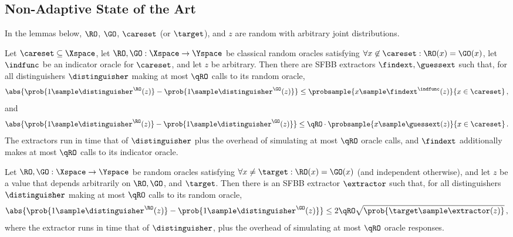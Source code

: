   \subsection{Non-Adaptive State of the Art}
    In the lemmas below, $\RO$, $\GO$, $\careset$ (or $\target$), and $z$ are random
      with arbitrary joint distributions.

    \begin{lemma}
      Let $\careset \subseteq \Xspace$, let $\RO, \GO: \Xspace \to \Yspace$
      be classical random oracles satisfying $\forall x \not\in \careset: \RO(x) =
      \GO(x)$, let $\indfunc$ be an indicator oracle for $\careset$, and let $z$ be arbitrary. Then 
      there are SFBB extractors $\findext, \guessext$ such that, for all distinguishers
      $\distinguisher$ making at most $\qRO$ calls to its random oracle,
      \[
        \abs{
          \prob{1 \sample \distinguisher^{\RO}(z)} - \prob{1 \sample \distinguisher^{\GO}(z)}
        } \leq \probsample{x \sample \findext^{\indfunc}(z)}{x \in \careset}\, ,
      \]
      and
      \[
        \abs{
          \prob{1 \sample \distinguisher^{\RO}(z)} - \prob{1 \sample \distinguisher^{\GO}(z)}
        } \leq \qRO \cdot \probsample{x \sample \guessext(z)}{x \in \careset}\, .
      \]
      The extractors run in time that of $\distinguisher$ plus the
      overhead of simulating at most $\qRO$ oracle calls, and
      $\findext$ additionally makes at most $\qRO$ calls to its
      indicator oracle.
    \end{lemma}

    \begin{lemma}
      Let $\RO, \GO: \Xspace \to \Yspace$
      be random oracles satisfying $\forall x \neq \target: \RO(x) =
      \GO(x)$ (and independent otherwise), and let $z$ be a value that depends arbitrarily on $\RO, \GO$,
      and $\target$. Then there is an SFBB extractor $\extractor$ such that, for all distinguishers
      $\distinguisher$ making at most $\qRO$ calls to its random oracle,
      \[
        \abs{
          \prob{1 \sample \distinguisher^{\RO}(z)} - \prob{1 \sample \distinguisher^{\GO}(z)}
        } \leq 2\qRO \sqrt{\prob{\target \sample \extractor(z)}}\, ,
      \]
      where the extractor runs in time that of $\distinguisher$, plus the
      overhead of simulating at most $\qRO$ oracle responses.
    \end{lemma}

